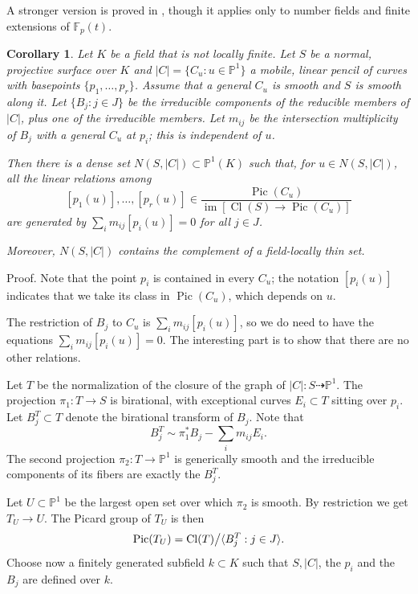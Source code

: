 \documentclass{amsart}
\newtheorem{cor}[thm]{Corollary}
\theoremstyle{definition}
\theoremstyle{remark}
\newcommand{\p}[0]{{\mathbb P}}
\newcommand{\f}[0]{{\mathbb F}}
\newcommand{\map}[0]{\dasharrow}
\newcommand{\pic}[0]{\operatorname{Pic}}
\newcommand{\im}[0]{\operatorname{im}}
\newcommand{\cl}[0]{\operatorname{Cl}}
\newcommand{\tsum}[0]{\textstyle{\sum}}
\begin{document}
A  stronger version is proved in \cite[Thm.C]{MR703488}, though it applies only to number fields and finite extensions of $\f_p(t)$. 



\begin{cor} \label{neron.thm.cor}
Let $K$ be a field that is not locally finite.  Let $S$ be a normal, projective surface over $K$ and 
 $|C|=\{C_u: u\in \p^1\}$   a mobile, linear pencil of curves with basepoints
$\{p_1,\dots, p_r\}$. Assume that  a general $C_u$ is smooth 
and $S$ is smooth along it. Let $\{B_j:j\in J\}$ be the irreducible components of the reducible members of $|C|$, plus one of the
irreducible members. 
Let $m_{ij}$ be the intersection multiplicity  of $B_j$ with a general
$C_u$  at $p_i$; this is independent of $u$. 


Then there is a dense set  $N(S, |C|)\subset  \p^1(K)$ such that, for $u\in N(S, |C|)$,  
all the linear relations among 
 $$[ p_1(u)], \dots, [ p_r(u)]\in \frac{\pic(C_u)}{\im[\cl(S)\to \pic(C_u)]}
$$ 
are generated by
$\tsum_i m_{ij}[ p_i(u)]=0$ for all $j\in J$.

Moreover, $N(S, |C|)$ contains the complement of a field-locally thin set.

\end{cor} 

Proof. Note that the point $p_i$ is contained in every $C_u$; the notation
$[ p_i(u)]$ indicates that we take its class in $\pic(C_u) $, which depends on $u$.

The restriction of $B_j$ to $C_u$ is 
$\tsum_i m_{ij}[ p_i(u)]$, so we do need to have the equations $\tsum_i m_{ij}[ p_i(u)]=0$.
The interesting part is to show that there are no other relations. 


Let $T$ be the normalization of the closure of the graph of
$|C|:S\map \p^1$. The projection $\pi_1:T\to S$ is birational, with exceptional curves $E_i\subset T$ sitting over $p_i$.   
Let $B_j^T\subset T$ denote the birational transform of $B_j$.  
Note that 
$$B_j^T\sim \pi_1^*B_j-\tsum_i m_{ij}E_i.
$$
The second projection $\pi_2:T\to \p^1$ is generically smooth and the irreducible components of its fibers are exactly the $B_j^T$. 

Let   $U\subset \p^1$ be the largest open set over which $\pi_2$ is smooth.
By restriction we get $T_U\to U$. 
The Picard group  of $T_U$ is then
$$
\pic(T_U)=\cl(T)\bigr\slash \langle B_j^T:j\in J\rangle.
$$ 
Choose now a finitely generated subfield $k\subset K$ such that  $S,|C|$, 
the $p_i$ and the $B_j$ are defined over $k$.
\end{document}
